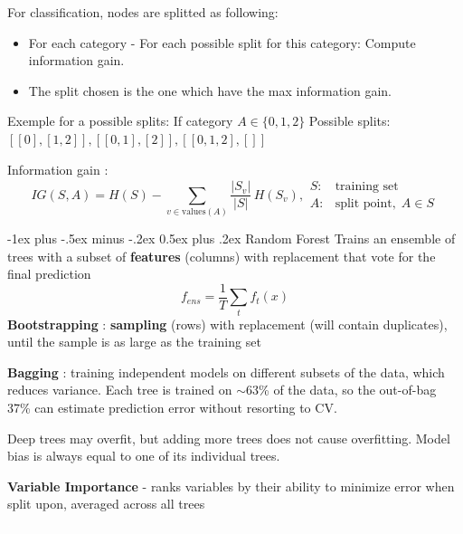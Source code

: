 \documentclass[10pt,landscape]{article}
\makeatletter
\renewcommand{\subsection}{\@startsection{subsection}{2}{0mm}%
                                {-1ex plus -.5ex minus -.2ex}%
                                {0.5ex plus .2ex}%
                                {\normalfont\normalsize\bfseries}}
\makeatother
\begin{document}
\begin{multicols}{3}
    \vspace{+1mm}
    For classification, nodes are splitted as following:
    \begin{itemize}[label={--},leftmargin=4mm]
        \vspace{-1mm}
        \itemsep -.4mm
        \item For each category
              \subitem - For each possible split for this category:
              Compute information gain.
        \item The split chosen is the one which have the max information gain.
    \end{itemize}


    Exemple for a possible splits:
    If category $A\in \{0,1,2\}$
    Possible splits:
    $[[0],[1,2]], [[0,1],[2]], [[0,1,2],[]]$


    Information gain :
    $$IG(S,A) = H(S) - \sum_{v \in \mathrm{values}(A)}\frac{\lvert S_v \rvert}{\lvert S \rvert}\, H(S_v)
        ,
        \begin{array}{rl}
            S: & \text{training set}           \\[2pt]
            A: & \text{split point},\; A \in S
        \end{array}
    $$

    \subsection{Random Forest}
    Trains an ensemble of trees with a subset of \textbf{features} (columns) with replacement that vote for the final prediction
    $$f_{ens}=\frac{1}{T} \sum_{t}f_t(x)$$
    \textbf{Bootstrapping} : \textbf{sampling} (rows) with replacement (will contain duplicates), until the sample is as large as the training set

    \textbf{Bagging} : training independent models on different subsets of the data, which reduces variance. Each tree is trained on $\sim$63\% of the data, so the out-of-bag 37\% can estimate prediction error without resorting to CV.

    Deep trees may overfit, but adding more trees does not cause overfitting. Model bias is always equal to one of its individual trees.

    \textbf{Variable Importance} - ranks variables by their ability to minimize error when split upon, averaged across all trees
    \\\textcolor{white}{.}\vspace{-5mm}\\ %


\end{multicols}
\end{document}
